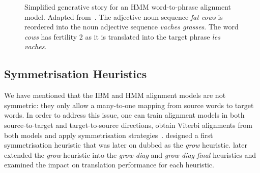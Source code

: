 \begin{figure}
  \begin{center}
  \end{center}
  \caption{Simplified generative story for an HMM word-to-phrase alignment model.
    Adapted from~\citep{deng-and-byrne:2008:ASLP}.
    The adjective noun sequence \emph{fat cows} is
    reordered into the noun adjective sequence \emph{vaches grasses}.
    The word \emph{cows} has fertility 2 as it is translated
    into the target phrase \emph{les vaches}.}
  \label{fig:wordtophrase}
\end{figure}

\subsection{Symmetrisation Heuristics}
\label{sec:symmetrisationHeuristics}

We have mentioned that the IBM and HMM alignment models
are not symmetric: they only allow a many-to-one mapping from
source words to target words.
In order to address this issue, one can train
alignment models in both source-to-target and target-to-source
directions, obtain Viterbi alignments from
both models and apply symmetrisation
strategies~\citep{och-tillmann-ney:1999:EMNLP,och-ney:2003:CL,koehn-och-marcu:2003:NAACL}.
\citet{och-tillmann-ney:1999:EMNLP} designed
a first symmetrisation heuristic that was later on dubbed
as the \emph{grow} heuristic. \citet{koehn-och-marcu:2003:NAACL}
later extended the \emph{grow} heuristic into
the \emph{grow-diag} and \emph{grow-diag-final} heuristics
and examined the impact on translation
performance for each heuristic.

